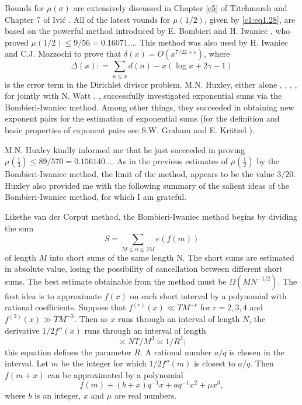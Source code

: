 Bounds for $\mu(\sigma)$ are extensively discussed in Chapter \ref{c5} of
Titchmarsh \cite{Titchmarsh1} and Chapter 7 of Ivi\'c \cite{Ivic1}. All of the
latest vounds for $\mu(1/2)$, given by \eqref{c1:eq1.28}, are based on
the powerful method introduced by E. Bombieri and H. Iwaniec \cite{Bombieri and Iwaniec1},
who proved $\mu(1/2)\leq 9/56= 0.16071 \ldots$. This method was also
used by H. Iwaniec and C.J. Mozzochi \cite{Iwaniec1} to prove that
$\delta(x)= O (x^{7/22+\epsilon})$, where
$$
\Delta (x) : = \sum_{n \leq x} d(n) - x (\log x + 2 \gamma -1)
$$
is the error term in the Dirichlet divisor problem. M.N. Huxley,
either alone \cite{Huxley2}, \cite{Huxley3}, \cite{Huxley4}, \cite{Huxley5}, for jointly with
N. Watt \cite{Watt1}, \cite{Huxley2}, successfully investigated exponential sums
via the Bombieri-Iwaniec method. Among other things, they succeeded
in obtaining new exponent pairs for the estimation of exponential sums
(for the definition and basic properties of exponent pairs see
S.W. Graham \cite{Graham1} and E. Kr\"atzel \cite{Kratzel1}).

M.N. Huxley kindly informed me that he just succeeded in proving $\mu
(\frac{1}{3}) \leq 89/570= 0.156140\ldots$. As in the previous
estimates of $\mu(\frac{1}{2})$ by the Bombieri-Iwaniec method, the
limit of the method, appears to be the value $3/20$. Huxley also provided me with the following summary of the salient ideas of the Bombieri-Iwaniec method, for which I am grateful. 

Like\pageoriginale the van der Corput method, the Bombieri-Iwaniec
method begins by dividing the sum
$$
S= \sum_{M \leq n \leq 2 M} e(f(m))
$$
of length $M$ into short sums of the same length N. The short sums are
estimated in absolute value, losing the possibility of cancellation
between different short sums. The best estimate obtainable from the
method must be $\Omega (MN^{- 1/2})$. The first idea is to approximate
$f(x)$ on each short interval by a polynomial with rational
coefficients. Suppose that $f^{(r)}(x)\ll TM^{-r}$ for $r= 2, 3, 4$
and $f^{(3)}(x) \gg TM^{-3}$. Then as $x$ runs through an interval of
length $N$, the derivative $1/2 f'' (x)$ runs through an interval of
length 
$$
\asymp NT /M^3 \asymp 1/R^2;
$$
this equation defines the parameter $R$. A rational number $a/q$ is
chosen in the interval. Let $m$ be the integer for which $1/2 f'' (m)$
is closest to $a/q$. Then $f(m +x)$ can be approximated by a
polynomial
$$
f(m) + (b+ x)q^{-1} x+ aq^{-1} x^2 + \mu x^3,
$$ 
where $b$ is an integer, $x$ and $\mu$ are real numbers.

